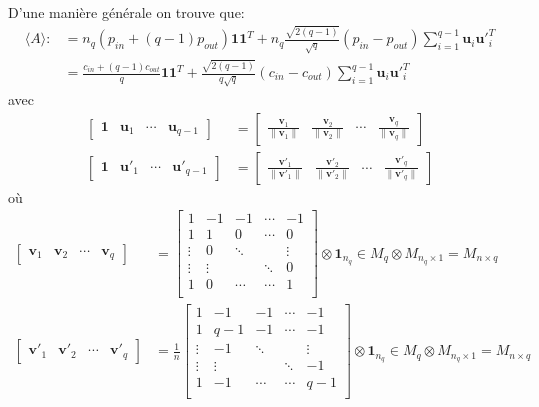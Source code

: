 D'une manière générale on trouve que:
\begin{align} 
\langle A \rangle :&= n_q(p_{in} + (q-1)p_{out}) \mathbf{11}^T + n_q\frac{\sqrt{2(q-1)}}{\sqrt{q}}(p_{in}-p_{out})\sum_{i=1}^{q-1}\mathbf{u}_i\mathbf{u'}_i^T\\
				   &= \frac{c_{in} + (q-1)c_{out}}{q} \mathbf{11}^T + \frac{\sqrt{2(q-1)}}{q\sqrt{q}}(c_{in}-c_{out})\sum_{i=1}^{q-1}\mathbf{u}_i\mathbf{u'}_i^T
\end{align}
avec
\begin{align}
\begin{bmatrix}
\mathbf{1} & \mathbf{u}_1 & \cdots & \mathbf{u}_{q - 1}
\end{bmatrix} 
&=
\begin{bmatrix}
\frac{\mathbf{v}_1}{\parallel \mathbf{v}_1 \parallel} & \frac{\mathbf{v}_2}{\parallel \mathbf{v}_2 \parallel} & \cdots & \frac{\mathbf{v}_q}{\parallel \mathbf{v}_q \parallel}
\end{bmatrix}\\
\begin{bmatrix}
\mathbf{1} & \mathbf{u'}_1 & \cdots & \mathbf{u'}_{q - 1}
\end{bmatrix} 
&=
\begin{bmatrix}
\frac{\mathbf{v'}_1}{\parallel \mathbf{v'}_1 \parallel} & \frac{\mathbf{v'}_2}{\parallel \mathbf{v'}_2 \parallel} & \cdots & \frac{\mathbf{v'}_q}{\parallel \mathbf{v'}_q \parallel}
\end{bmatrix}
\end{align}
où 
\begin{align*}
\begin{bmatrix}
\mathbf{v}_1 & \mathbf{v}_2 &  \cdots & \mathbf{v}_{q}
\end{bmatrix} 
&=
\begin{bmatrix}
1 & -1 & -1 & \cdots & -1 \\
1 & 1 & 0 & \cdots & 0 \\
\vdots & 0 & \ddots &  & \vdots \\
\vdots & \vdots &  & \ddots & 0 \\
1 & 0 & \cdots& \cdots & 1 \\
\end{bmatrix} \otimes \mathbf{1}_{n_q} \in \mathit{M}_q \otimes \mathit{M}_{n_q\times1}=\mathit{M}_{n\times q}\\
\begin{bmatrix}
\mathbf{v'}_1 & \mathbf{v'}_2 &  \cdots & \mathbf{v'}_{q}
\end{bmatrix} 
&= \frac{1}{n}
\begin{bmatrix}
1 & -1 & -1 & \cdots & -1 \\
1 & q -1 & -1 & \cdots & -1 \\
\vdots & -1 & \ddots &  & \vdots \\
\vdots & \vdots &  & \ddots & -1 \\
1 & -1 & \cdots& \cdots & q-1 \\
\end{bmatrix}\otimes \mathbf{1}_{n_q} \in \mathit{M}_q \otimes \mathit{M}_{n_q\times1}=\mathit{M}_{n\times q}\\
\end{align*}
